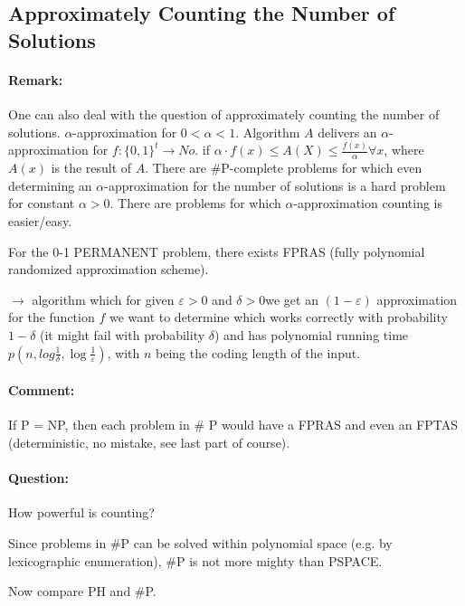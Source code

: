\documentclass[11pt]{article}
\theoremstyle{definition}
\theoremstyle{definition}
\begin{document}

\subsection{Approximately Counting the Number of Solutions}

\paragraph{Remark:} One can also deal with the question of approximately counting the number of solutions. $ \alpha $-approximation for $ 0 < \alpha < 1 $. Algorithm $ A $ delivers an $ \alpha$-approximation for $ f : \{0, 1\}^t \rightarrow No $. if $ \alpha \cdot f(x) \leq A(X) \leq \frac{f(x)}{\alpha} \forall x $, where $ A(x) $ is the result of $ A $. There are \#P-complete problems for which even determining an $ \alpha $-approximation for the number of solutions is a hard problem for constant $ \alpha > 0 $. There are problems for which $ \alpha $-approximation counting is easier/easy.

For the 0-1 PERMANENT problem, there exists FPRAS (fully polynomial randomized approximation scheme).

$ \rightarrow $ algorithm which for given $ \varepsilon > 0 $ and $ \delta > 0 $we get an $(1 - \varepsilon)$ approximation for the function $ f $ we want to determine which works correctly with probability $ 1 - \delta $ (it might fail with probability $ \delta $) and has polynomial running time $ p(n, log \frac{1}{\delta}, \log \frac{1}{\varepsilon}) $, with $ n $ being the coding length of the input.

\paragraph{Comment:} If P = NP, then each problem in \# P would have a FPRAS and even an FPTAS (deterministic, no mistake, see last part of course).

\paragraph{Question:} How powerful is counting?

Since problems in \#P can be solved within polynomial space (e.g. by lexicographic enumeration), \#P is not more mighty than PSPACE.

Now compare PH and \#P.
\end{document}
